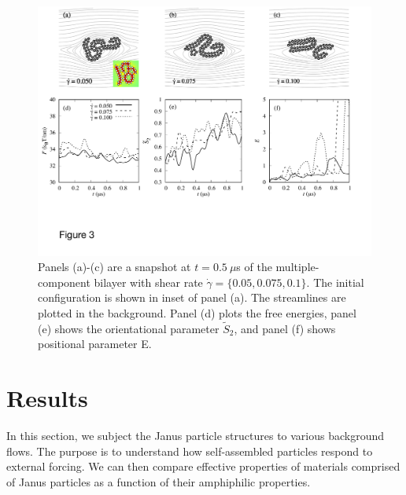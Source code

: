 \documentclass[prb,preprint,showpacs,preprintnumbers,amsmath,amssymb,longbibliography]{revtex4-1}
\begin{document}
\begin{figure}
  \begin{center}
   \includegraphics[width=1.0\textwidth]{Figures/Figure3.pdf}
  \end{center}
  \caption{
    \label{fig:BC1_shear}
    Panels (a)-(c) are a snapshot at $t=0.5\ \mu$s of the multiple-component bilayer
    with shear rate $\dot \gamma = \{0.05, 0.075, 0.1\}$.
    The initial configuration is shown in inset of panel (a).
    The streamlines are plotted in the background.
    Panel (d) plots the free energies,
    panel (e) shows the orientational parameter $\tilde{S}_2$,
    and panel (f) shows positional parameter E.
}
\end{figure}



\section{Results}
\label{sec:results}
In this section, we subject the Janus particle structures to various background
flows.  The purpose is to understand how self-assembled particles
respond to external forcing.
We can then compare effective properties of
materials comprised of Janus particles as a function
of their amphiphilic properties.  
\end{document}
